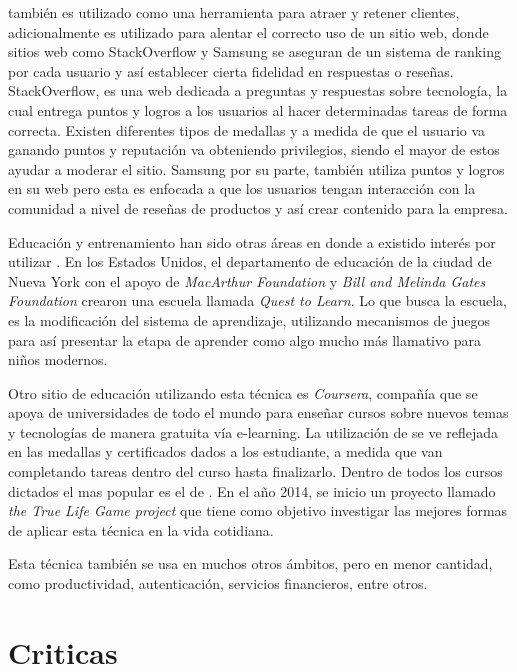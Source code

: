 {\GAM} también es utilizado como una herramienta para atraer y retener clientes,
adicionalmente es utilizado para alentar el correcto uso de un sitio web,
donde sitios web como StackOverflow y Samsung se aseguran de un sistema
de ranking por cada usuario y así establecer cierta fidelidad en respuestas
o reseñas.
StackOverflow, es una web dedicada a preguntas y respuestas sobre tecnología,
la cual entrega puntos  y logros a los usuarios al hacer determinadas tareas
de forma correcta.
Existen diferentes tipos de medallas y a medida  de que el usuario va ganando
puntos y reputación va obteniendo privilegios, siendo el mayor de estos ayudar a
moderar el sitio.
Samsung por su parte, también utiliza puntos y logros en su web pero esta
es enfocada a que los usuarios tengan interacción con la comunidad a nivel de
reseñas de productos y así crear contenido para la empresa\cite{Gam:Util:3}.

Educación y entrenamiento han sido otras áreas en donde a existido interés por
utilizar {\GAM}.
En los Estados Unidos, el departamento de educación de la ciudad de Nueva York
con el apoyo de \emph{MacArthur Foundation} y \emph{Bill and Melinda Gates
Foundation} crearon una escuela  llamada \emph{Quest to Learn}.
Lo que busca la escuela, es la modificación del sistema de aprendizaje,
utilizando mecanismos de juegos para así presentar la etapa de aprender
como algo mucho más llamativo para niños modernos\cite{Gam:Util:4}.

Otro sitio de educación utilizando esta técnica es \emph{Coursera},
compañía que se apoya de universidades de todo el mundo para enseñar
cursos sobre nuevos temas y tecnologías de manera gratuita vía e-learning.
La utilización de {\GAM} se ve reflejada en las medallas y certificados dados
a los estudiante, a medida que van completando tareas dentro del curso
hasta finalizarlo.
Dentro de todos los cursos dictados el mas popular es el de {\GAM}\cite{Gam:Util:5}.
En el año 2014, se inicio un proyecto llamado \emph{the True Life Game project}
que tiene como objetivo investigar las mejores formas de aplicar esta técnica en
la vida cotidiana.

Esta técnica también se usa en muchos otros ámbitos, pero en menor cantidad,
como productividad, autenticación, servicios financieros, entre otros.

\section{Criticas}

